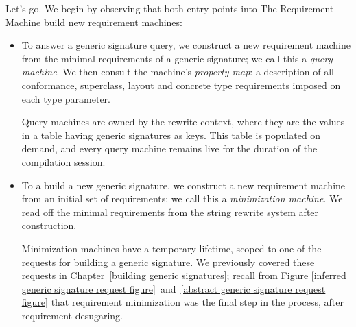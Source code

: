 \documentclass[../generics]{subfiles}
\begin{document}
Let's go. We begin by observing that both entry points into The Requirement Machine build new requirement machines:
\begin{itemize}
\item To answer a generic signature query, we construct a new requirement machine from the minimal requirements of a generic signature; we call this a \emph{query machine}. We then consult the machine's \emph{property map}: a description of all conformance, superclass, layout and concrete type requirements imposed on each type parameter.

Query machines are owned by the rewrite context, where they are the values in a table having generic signatures as keys. This table is populated on demand, and every query machine remains live for the duration of the compilation session.

\item To a build a new generic signature, we construct a new requirement machine from an initial set of requirements; we call this a \emph{minimization machine}. We read off the minimal requirements from the string rewrite system after construction.

Minimization machines have a temporary lifetime, scoped to one of the requests for building a generic signature. We previously covered these requests in Chapter~\ref{building generic signatures}; recall from Figure \ref{inferred generic signature request figure}~and~\ref{abstract generic signature request figure} that requirement minimization was the final step in the process, after requirement desugaring. 
\end{itemize}

\begin{figure}\label{rqm flowchart generic signature}
\begin{center}
\end{center}
\end{figure}
\end{document}
